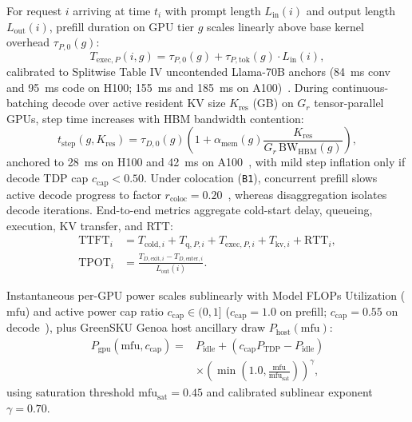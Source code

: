 For request $i$ arriving at time $t_i$ with prompt length $L_{\text{in}}(i)$ and output length $L_{\text{out}}(i)$, prefill duration on GPU tier $g$ scales linearly above base kernel overhead $\tau_{P,0}(g)$:
\begin{equation}\label{eq:prefill_lat}
T_{\text{exec},P}(i,g) = \tau_{P,0}(g) + \tau_{P,\text{tok}}(g)\cdot L_{\text{in}}(i),
\end{equation}
calibrated to Splitwise Table IV uncontended Llama-70B anchors (\SI{84}{\milli\second} conv and \SI{95}{\milli\second} code on H100; \SI{155}{\milli\second} and \SI{185}{\milli\second} on A100)~\cite{patel2024splitwise}. During continuous-batching decode over active resident KV size $K_{\text{res}}$ (GB) on $G_r$ tensor-parallel GPUs, step time increases with HBM bandwidth contention:
\begin{equation}\label{eq:decode_step}
t_{\text{step}}(g, K_{\text{res}}) = \tau_{D,0}(g) \left(1 + \alpha_{\text{mem}}(g)\frac{K_{\text{res}}}{G_r\,\text{BW}_{\text{HBM}}(g)}\right),
\end{equation}
anchored to \SI{28}{\milli\second} on H100 and \SI{42}{\milli\second} on A100~\cite{patel2024splitwise,stojkovic2025dynamollm}, with mild step inflation only if decode TDP cap $c_{\text{cap}} < 0.50$. Under colocation (\texttt{B1}), concurrent prefill slows active decode progress to factor $r_{\text{coloc}}=0.20$~\cite{agrawal2024sarathi,patel2024splitwise}, whereas disaggregation isolates decode iterations. End-to-end metrics aggregate cold-start delay, queueing, execution, KV transfer, and RTT:
\begin{equation}\label{eq:slo_metrics}
\begin{aligned}
\text{TTFT}_i &= T_{\text{cold},i} + T_{\text{q},P,i} + T_{\text{exec},P,i} + T_{\text{kv},i} + \text{RTT}_i, \\
\text{TPOT}_i &= \frac{T_{D,\text{exit},i} - T_{D,\text{enter},i}}{L_{\text{out}}(i)}.
\end{aligned}
\end{equation}

Instantaneous per-GPU power scales sublinearly with Model FLOPs Utilization ($\text{mfu}$) and active power cap ratio $c_{\text{cap}} \in (0, 1]$ ($c_{\text{cap}}=1.0$ on prefill; $c_{\text{cap}}=0.55$ on decode~\cite{patel2024splitwise}), plus GreenSKU Genoa host ancillary draw $P_{\text{host}}(\text{mfu})$:
\begin{equation}\label{eq:power}
\begin{aligned}
P_{\text{gpu}}(\text{mfu}, c_{\text{cap}}) ={}& P_{\text{idle}} + \left(c_{\text{cap}} P_{\text{TDP}} - P_{\text{idle}}\right) \\
&\times \left(\min\!\left(1.0, \frac{\text{mfu}}{\text{mfu}_{\text{sat}}}\right)\right)^{\gamma},
\end{aligned}
\end{equation}
using saturation threshold $\text{mfu}_{\text{sat}}=0.45$ and calibrated sublinear exponent $\gamma=0.70$.


